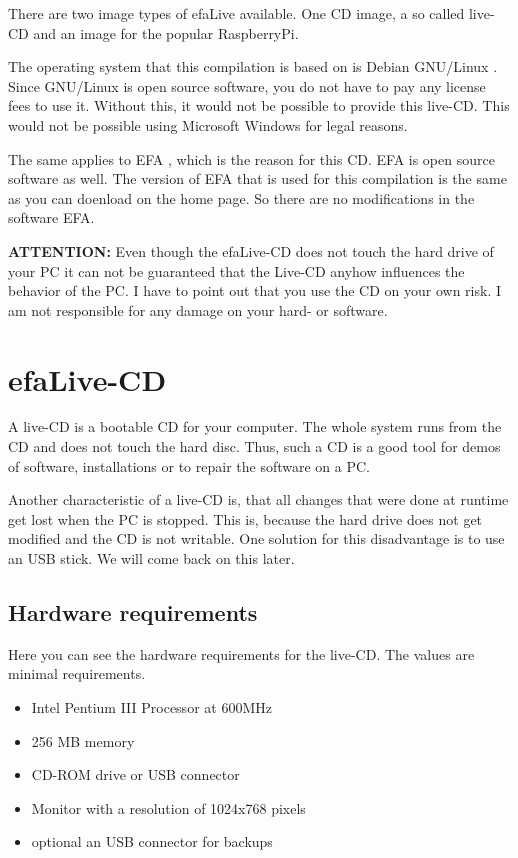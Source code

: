 \documentclass[a4paper,12pt,twoside]{article}
\begin{document}
There are two image types of efaLive available. One CD image, a so called 
live-CD and an image for the popular RaspberryPi.

The operating system that this compilation is based on is Debian GNU/Linux \cite{DEB1}.
Since GNU/Linux is open source software, you do not have to pay any license
fees to use it. Without this, it would not be possible to provide this
live-CD. This would not be possible using Microsoft Windows for legal
reasons. 

The same applies to EFA \cite{EFA1}, which is the reason for
this CD. EFA is open source software as well. The version of EFA that is used
for this compilation is the same as you can doenload on the home page. So there
are no modifications in the software EFA.

\bigskip
\textbf{ATTENTION:} Even though the efaLive-CD does not touch the hard drive of your PC
it can not be guaranteed that the Live-CD anyhow influences the
behavior of the PC. I have to point out that you use the CD on your own
risk. I am not responsible for any damage on your hard- or software.
\bigskip

\section{efaLive-CD}
\label{sct:efalivecd}
A live-CD is a bootable CD for your computer. The whole system runs from
the CD and does not touch the hard disc. Thus, such a CD is a good tool
for demos of software, installations or to repair the software on a PC.

Another characteristic of a live-CD is, that all changes that were done
at runtime get lost when the PC is stopped. This is, because the hard
drive does not get modified and the CD is not writable. One solution
for this disadvantage is to use an USB stick. We will come back on this
later.

\subsection{Hardware requirements}
\label{sct:live_hardware}
Here you can see the hardware requirements for the live-CD. The values
are minimal requirements.

\begin{itemize}
    \item Intel Pentium III Processor at 600MHz
    \item 256 MB memory
    \item CD-ROM drive or USB connector
    \item Monitor with a resolution of 1024x768 pixels
    \item optional an USB connector for backups
\end{itemize}
\end{document}
